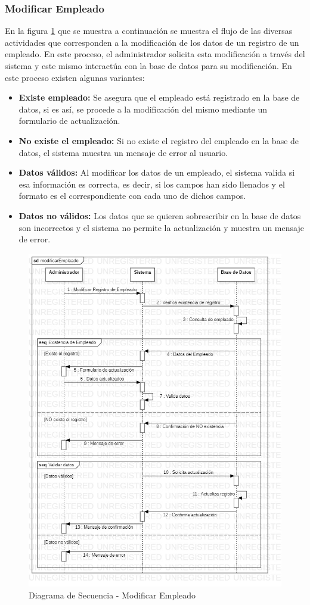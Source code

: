 \subsubsection{Modificar Empleado}
En la figura \ref{fig:Diagrama de Secuencia - Modificar Empleado} que se muestra a continuación se muestra el flujo de las diversas actividades que corresponden a la modificación de los datos de un registro de un empleado. En este proceso, el administrador solicita esta modificación a través del sistema y este mismo interactúa con la base de datos para su modificación. En este proceso existen algunas variantes:
\begin{itemize}
	\item \textbf{Existe empleado:} Se asegura que el empleado está registrado en la base de datos, si es así, se procede a la modificación del mismo mediante un formulario de actualización.
	\item \textbf{No existe el empleado:} Si no existe el registro del empleado en la base de datos, el sistema muestra un mensaje de error al usuario.
	\item \textbf{Datos válidos:} Al modificar los datos de un empleado, el sistema valida si esa información es correcta, es decir, si los campos han sido llenados y el formato es el correspondiente con cada uno de dichos campos.
	\item \textbf{Datos no válidos:} Los datos que se quieren sobrescribir en la base de datos son incorrectos y el sistema no permite la actualización y muestra un mensaje de error.
\end{itemize}
\begin{figure}[!h]
	\centering
	\includegraphics[width=1\textwidth]{./diseno/vprocesos/imagenes/modificarEmpleado}
	\caption{Diagrama de Secuencia - Modificar Empleado}
	\label{fig:Diagrama de Secuencia - Modificar Empleado}
\end{figure}
\clearpage